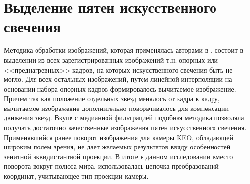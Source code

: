 \documentclass[12pt,a4paper]{article}
\begin{document}
\section{Выделение пятен искусственного свечения} \label{sec:glow}
Методика обработки изображений, которая применялась авторами в \cite{Grach2012}, состоит в выделении из всех зарегистрированных изображений т.н. опорных или <<преднагревных>> кадров, на которых искусственного свечения быть не могло. Для всех остальных изображений, путем линейной интерполяции на основании набора опорных кадров формировалось вычитаемое изображение. Причем так как положение отдельных звезд менялось от кадра к кадру, вычитаемое изображение дополнительно поворачивалось для компенсации движения звезд. Вкупе с медианной фильтрацией подобная методика позволяла получать достаточно качественные изображения пятен искусственного свечения. Применявшийся ранее поворот изображения для камеры KEO, обладающей широким полем зрения, не дает желаемых результатов ввиду особенностей зенитной эквидистантной проекции. В итоге в данном исследовании вместо поворота вокруг полюса мира, использовалась цепочка преобразований координат, учитывающее тип проекции камеры.
\end{document}
